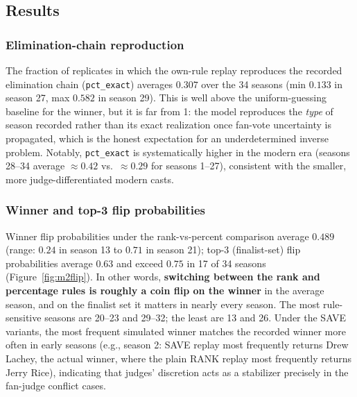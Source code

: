 \documentclass[11pt]{article}
\begin{document}
\subsection{Results}

\subsubsection{Elimination-chain reproduction}

The fraction of replicates in which the own-rule replay reproduces the recorded
elimination chain (\texttt{pct\_exact}) averages $\mathbf{0.307}$ over the 34 seasons
(min $0.133$ in season 27, max $0.582$ in season 29). This is well above the
uniform-guessing baseline for the winner, but it is far from 1: the model reproduces the
\emph{type} of season recorded rather than its exact realization once fan-vote
uncertainty is propagated, which is the honest expectation for an underdetermined inverse
problem. Notably, \texttt{pct\_exact} is systematically higher in the modern era
(seasons 28--34 average $\approx 0.42$ vs.\ $\approx 0.29$ for seasons 1--27), consistent
with the smaller, more judge-differentiated modern casts.

\subsubsection{Winner and top-3 flip probabilities}

Winner flip probabilities under the rank-vs-percent comparison average $\mathbf{0.489}$
(range: $0.24$ in season 13 to $0.71$ in season 21); top-3 (finalist-set) flip
probabilities average $\mathbf{0.63}$ and exceed $0.75$ in 17 of 34 seasons
(Figure~\ref{fig:m2flip}). In other words, \textbf{switching between the rank and
percentage rules is roughly a coin flip on the winner} in the average season, and on
the finalist set it matters in nearly every season. The most rule-sensitive seasons are
20--23 and 29--32; the least are 13 and 26. Under the SAVE variants, the most frequent
simulated winner matches the recorded winner more often in early seasons (e.g., season 2:
SAVE replay most frequently returns Drew Lachey, the actual winner, where the plain
RANK replay most frequently returns Jerry Rice), indicating that judges' discretion
acts as a stabilizer precisely in the fan-judge conflict cases.
\end{document}
